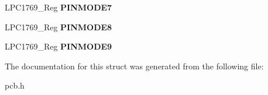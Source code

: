 \begin{DoxyCompactItemize}
\item 
\hypertarget{struct_l_p_c1769___p_i_n_m_o_d_e_a3d00d84a84a3b9928b1f452301ced424}{L\+P\+C1769\+\_\+\+Reg {\bfseries P\+I\+N\+M\+O\+D\+E7}}\label{struct_l_p_c1769___p_i_n_m_o_d_e_a3d00d84a84a3b9928b1f452301ced424}

\item 
\hypertarget{struct_l_p_c1769___p_i_n_m_o_d_e_a4fb7909c18148c7139955d904383a9b8}{L\+P\+C1769\+\_\+\+Reg {\bfseries P\+I\+N\+M\+O\+D\+E8}}\label{struct_l_p_c1769___p_i_n_m_o_d_e_a4fb7909c18148c7139955d904383a9b8}

\item 
\hypertarget{struct_l_p_c1769___p_i_n_m_o_d_e_a0095de3723dcd192d6261f26d17c2fbe}{L\+P\+C1769\+\_\+\+Reg {\bfseries P\+I\+N\+M\+O\+D\+E9}}\label{struct_l_p_c1769___p_i_n_m_o_d_e_a0095de3723dcd192d6261f26d17c2fbe}

\end{DoxyCompactItemize}


The documentation for this struct was generated from the following file\+:\begin{DoxyCompactItemize}
\item 
pcb.\+h\end{DoxyCompactItemize}
